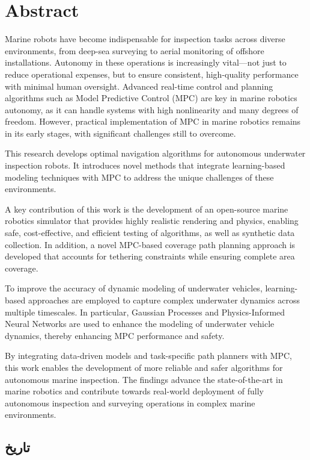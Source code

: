 \chapter*{Abstract}

Marine robots have become indispensable for inspection tasks across diverse environments, from deep-sea surveying to aerial monitoring of offshore installations. Autonomy in these operations is increasingly vital—not just to reduce operational expenses, but to ensure consistent, high-quality performance with minimal human oversight. Advanced real-time control and planning algorithms such as Model Predictive Control (MPC) are key in marine robotics autonomy, as it can handle systems with high nonlinearity and many degrees of freedom. However, practical implementation of MPC in marine robotics remains in its early stages, with significant challenges still to overcome. 

This research develops optimal navigation algorithms for autonomous underwater inspection robots. It introduces novel methods that integrate learning-based modeling techniques with MPC to address the unique challenges of these environments.

A key contribution of this work is the development of an open-source marine robotics simulator that provides highly realistic rendering and physics, enabling safe, cost-effective, and efficient testing of algorithms, as well as synthetic data collection. In addition, a novel MPC-based coverage path planning approach is developed that accounts for tethering constraints while ensuring complete area coverage.

To improve the accuracy of dynamic modeling of underwater vehicles, learning-based approaches are employed to capture complex underwater dynamics across multiple timescales. In particular, Gaussian Processes and Physics-Informed Neural Networks are used to enhance the modeling of underwater vehicle dynamics, thereby enhancing MPC performance and safety.

By integrating data-driven models and task-specific path planners with MPC, this work enables the development of more reliable and safer algorithms for autonomous marine inspection. The findings advance the state-of-the-art in marine robotics and contribute towards real-world deployment of fully autonomous inspection and surveying operations in complex marine environments.



\newpage
\section{تاريخ}

